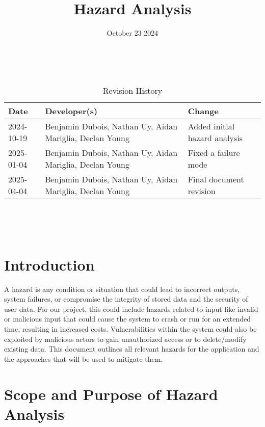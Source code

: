 \documentclass{article}
\title{Hazard Analysis\\\progname}
\author{\authname}
\date{October 23 2024}
\begin{document}
\maketitle
\thispagestyle{empty}

~\newpage


\begin{table}[hp]
\caption{Revision History} \label{TblRevisionHistory}
\begin{tabularx}{\textwidth}{llX}
\toprule
\textbf{Date} & \textbf{Developer(s)} & \textbf{Change}\\
\midrule
2024-10-19 & Benjamin Dubois, Nathan Uy, Aidan Mariglia, Declan Young & Added initial hazard analysis\\
\midrule
2025-01-04 & Benjamin Dubois, Nathan Uy, Aidan Mariglia, Declan Young & Fixed a failure mode\\
\midrule
2025-04-04 & Benjamin Dubois, Nathan Uy, Aidan Mariglia, Declan Young & Final document revision\\
\bottomrule
\end{tabularx}
\end{table}

~\newpage

\tableofcontents

\listoftables

\listoffigures

~\newpage


\section{Introduction}

A hazard is any condition or situation that could lead to incorrect outputs, system failures, or compromise the integrity of stored data and the security of user data. For our project, this could include hazards related to input like invalid or malicious input that could cause the system to crash or run for an extended time, resulting in increased costs. Vulnerabilities within the system could also be exploited by malicious actors to gain unauthorized access or to delete/modify existing data. This document outlines all relevant hazards for the application and the approaches that will be used to mitigate them.

\section{Scope and Purpose of Hazard Analysis}
\end{document}
